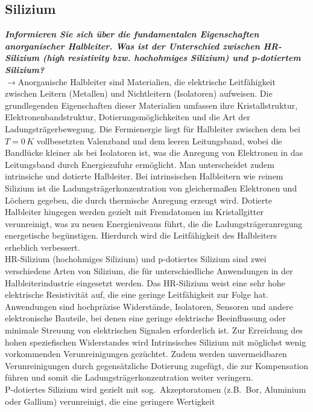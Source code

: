 \subsection{\label{subsec:FZV4}Silizium}
\textbf{\textit{Informieren Sie sich über die fundamentalen Eigenschaften anorganischer Halbleiter.
Was ist der Unterschied zwischen HR-Silizium (high resistivity bzw. hochohmiges
Silizium) und p-dotiertem Silizium?}}\\
$\rightarrow$Anorganische Halbleiter sind Materialien, die elektrische Leitfähigkeit zwischen Leitern 
(Metallen) und Nichtleitern (Isolatoren) aufweisen. 
Die grundlegenden Eigenschaften dieser Materialien umfassen ihre Kristallstruktur, 
Elektronenbandstruktur, Dotierungsmöglichkeiten und die Art der Ladungsträgerbewegung.
Die Fermienergie liegt für Halbleiter zwischen dem bei $T=0\,\si{K}$ vollbesetzten 
Valenzband und dem leeren Leitungsband, wobei die Bandlücke kleiner als bei Isolatoren ist, 
was die Anregung von Elektronen in das Leitungsband durch Energiezufuhr ermöglicht. 
Man unterscheidet zudem intrinsiche und dotierte Halbleiter. 
Bei intrinsischen Halbleitern wie reinem Silizium ist die Ladungsträgerkonzentration von 
gleichermaßen Elektronen und Löchern gegeben, die durch thermische Anregung erzeugt wird. 
Dotierte Halbleiter hingegen werden gezielt mit Fremdatomen im Kristallgitter verunreinigt, 
was zu neuen Energieniveaus führt, die die Ladungsträgeranregung energetische begünstigen. 
Hierdurch wird die Leitfähigkeit des Halbleiters erheblich verbessert. \\
HR-Silizium (hochohmiges Silizium) und p-dotiertes Silizium sind zwei verschiedene Arten von Silizium, 
die für unterschiedliche Anwendungen in der Halbleiterindustrie eingesetzt werden.
Das HR-Silizium weist eine sehr hohe elektrische Resistivität auf, die eine geringe Leitfähigkeit 
zur Folge hat. Anwendungen sind hochpräzise Widerstände, 
Isolatoren, Sensoren und andere elektronische Bauteile, bei denen eine geringe 
elektrische Beeinflussung oder minimale Streuung von elektrischen Signalen erforderlich ist.
Zur Erreichung des hohen speziefischen Widerstandes wird Intrinsisches Silizium mit 
möglichst wenig vorkommenden Verunreinigungen gezüchtet. Zudem werden unvermeidbaren Verunreinigungen 
durch gegensätzliche Dotierung zugefügt, die zur Kompensation führen und somit die Ladungsträgerkonzentration
weiter veringern. \\
P-dotiertes Silizium wird gezielt mit sog.~Akzeptoratomen (z.B.~Bor, Aluminium oder Gallium)
verunreinigt, die eine geringere Wertigkeit 
